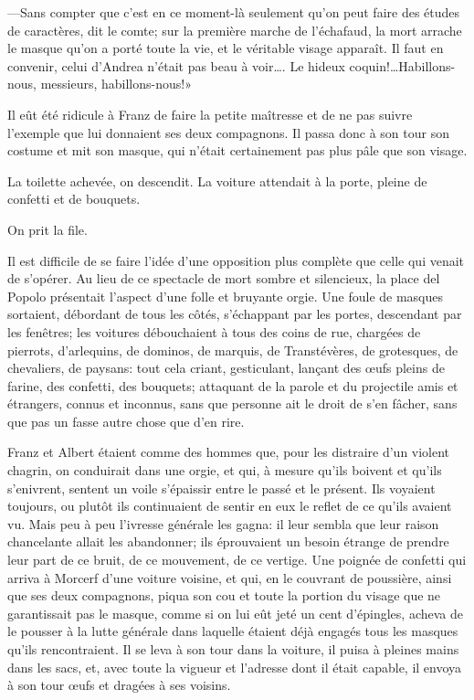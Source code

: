 —Sans compter que c'est en ce moment-là seulement qu'on peut faire des études de caractères, dit le comte; sur la première marche de l'échafaud, la mort arrache le masque qu'on a porté toute la vie, et le véritable visage apparaît. Il faut en convenir, celui d'Andrea n'était pas beau à voir\dots. Le hideux coquin!\dots Habillons-nous, messieurs, habillons-nous!»  

Il eût été ridicule à Franz de faire la petite maîtresse et de ne pas suivre l'exemple que lui donnaient ses deux compagnons. Il passa donc à son tour son costume et mit son masque, qui n'était certainement pas plus pâle que son visage. 

La toilette achevée, on descendit. La voiture attendait à la porte, pleine de confetti et de bouquets. 

On prit la file. 

Il est difficile de se faire l'idée d'une opposition plus complète que celle qui venait de s'opérer. Au lieu de ce spectacle de mort sombre et silencieux, la place del Popolo présentait l'aspect d'une folle et bruyante orgie. Une foule de masques sortaient, débordant de tous les côtés, s'échappant par les portes, descendant par les fenêtres; les voitures débouchaient à tous des coins de rue, chargées de pierrots, d'arlequins, de dominos, de marquis, de Transtévères, de grotesques, de chevaliers, de paysans: tout cela criant, gesticulant, lançant des œufs pleins de farine, des confetti, des bouquets; attaquant de la parole et du projectile amis et étrangers, connus et inconnus, sans que personne ait le droit de s'en fâcher, sans que pas un fasse autre chose que d'en rire. 

Franz et Albert étaient comme des hommes que, pour les distraire d'un violent chagrin, on conduirait dans une orgie, et qui, à mesure qu'ils boivent et qu'ils s'enivrent, sentent un voile s'épaissir entre le passé et le présent. Ils voyaient toujours, ou plutôt ils continuaient de sentir en eux le reflet de ce qu'ils avaient vu. Mais peu à peu l'ivresse générale les gagna: il leur sembla que leur raison chancelante allait les abandonner; ils éprouvaient un besoin étrange de prendre leur part de ce bruit, de ce mouvement, de ce vertige. Une poignée de confetti qui arriva à Morcerf d'une voiture voisine, et qui, en le couvrant de poussière, ainsi que ses deux compagnons, piqua son cou et toute la portion du visage que ne garantissait pas le masque, comme si on lui eût jeté un cent d'épingles, acheva de le pousser à la lutte générale dans laquelle étaient déjà engagés tous les masques qu'ils rencontraient. Il se leva à son tour dans la voiture, il puisa à pleines mains dans les sacs, et, avec toute la vigueur et l'adresse dont il était capable, il envoya à son tour œufs et dragées à ses voisins. 

